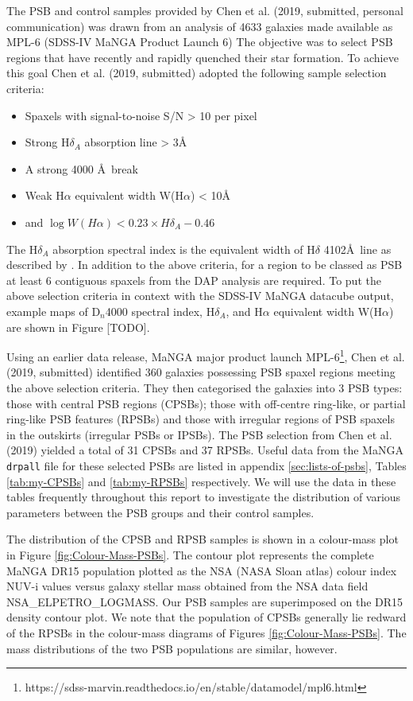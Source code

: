 The PSB and control samples provided by Chen et al. (2019, submitted, personal communication) was drawn from an analysis of 4633 galaxies made available as MPL-6 (SDSS-IV MaNGA Product Launch 6) The objective was to select PSB regions that have recently and rapidly quenched their star formation.  To achieve this goal Chen et al. (2019, submitted) adopted the following sample selection criteria:
\begin{itemize}
    \item Spaxels with signal-to-noise S/N > 10 per pixel
    \item Strong H$\delta_A$ absorption line > 3\AA 
    \item A strong 4000 \AA\ break 
    \item Weak H$\alpha$ equivalent width W(H$\alpha$) < 10\AA
    \item and $\log{W(H\alpha)} < 0.23\times{H\delta_A}-0.46$
\end{itemize}
The H$\delta_A$ absorption spectral index is the equivalent width of H$\delta$ 4102\AA\ line as described by \citet{1994ApJS...94..687W}. In addition to the above criteria, for a region to be classed as PSB at least 6 contiguous spaxels from the DAP analysis are required. To put the above selection criteria in context with the SDSS-IV MaNGA datacube output, example maps of D$_n$4000 spectral index, H$\delta_A$, and H$\alpha$ equivalent width W(H$\alpha$) are shown in Figure [TODO]. 

Using an earlier data release, MaNGA major product launch  MPL-6\footnote{https://sdss-marvin.readthedocs.io/en/stable/datamodel/mpl6.html}, Chen et al. (2019, submitted) identified 360 galaxies possessing PSB spaxel regions meeting the above selection criteria. They then categorised the galaxies into 3 PSB types: those with central PSB regions (CPSBs); those with off-centre ring-like, or partial ring-like PSB features (RPSBs) and those with irregular regions of PSB spaxels in the outskirts (irregular PSBs or IPSBs). The PSB selection from Chen et al. (2019) yielded a total of 31 CPSBs and 37 RPSBs. Useful data from the MaNGA \texttt{drpall} file for these selected PSBs are listed in appendix \ref{sec:lists-of-psbs}, Tables \ref{tab:my-CPSBs} and \ref{tab:my-RPSBs} respectively. We will use the data in these tables frequently throughout this report to investigate the distribution of various parameters between the PSB groups and their control samples.

The distribution of the CPSB and RPSB samples is shown in a colour-mass plot in Figure \ref{fig:Colour-Mass-PSBs}. The contour plot represents the complete MaNGA DR15 population plotted as the NSA (NASA Sloan atlas) colour index NUV-i values versus galaxy stellar mass obtained from the NSA data field  NSA\_ELPETRO\_LOGMASS. Our PSB samples are superimposed on the DR15 density contour plot. We note that the population of CPSBs generally lie redward of the RPSBs in the colour-mass diagrams of Figures \ref{fig:Colour-Mass-PSBs}. The mass distributions of the two PSB populations are similar, however.

